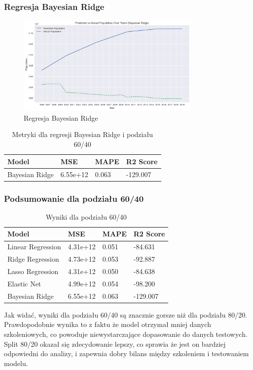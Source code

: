 \documentclass[11pt]{article}
\begin{document}
\subsubsection{Regresja Bayesian Ridge}
\begin{figure}[H]
        \centering
        \includegraphics[width=0.8\textwidth]{images/bayesian_ridge996.png}
        \caption{Regresja Bayesian Ridge}
\end{figure}
\begin{table}[H]
        \centering
        \begin{tabular}{|l|l|l|l|}
        \hline
        Model & MSE & MAPE & R2 Score \\ \hline
        Bayesian Ridge & 6.55e+12 & 0.063 & -129.007 \\ \hline
        \end{tabular}
        \caption{Metryki dla regresji Bayesian Ridge i podziału 60/40}
\end{table}
\subsubsection{Podsumowanie dla podziału 60/40}
\begin{table}[H]
        \centering
        \begin{tabular}{|l|l|l|l|}
        \hline
        Model & MSE & MAPE & R2 Score \\ \hline
        Linear Regression & 4.31e+12 & 0.051 & -84.631 \\ \hline
        Ridge Regression & 4.73e+12 & 0.053 & -92.887 \\ \hline
        Lasso Regression & 4.31e+12 & 0.050 & -84.638 \\ \hline
        Elastic Net & 4.99e+12 & 0.054 & -98.200 \\ \hline
        Bayesian Ridge & 6.55e+12 & 0.063 & -129.007 \\ \hline
        \end{tabular}
        \caption{Wyniki dla podziału 60/40}
        \end{table}
Jak widać, wyniki dla podziału 60/40 są znacznie gorsze niż dla podziału 80/20. Prawdopodobnie wynika to z faktu że model otrzymał mniej danych szkoleniowych, co powoduje niewystarczające dopasowanie do danych testowych.
Split 80/20 okazał się zdecydowanie lepszy, co sprawia że jest on bardziej odpowiedni do analizy, i zapewnia dobry bilans między szkoleniem i testowaniem modelu.
\end{document}
